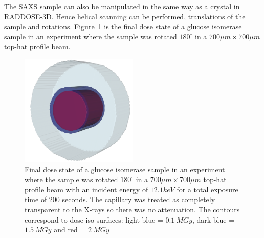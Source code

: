 The SAXS sample can also be manipulated in the same way as a crystal in RADDOSE-3D. Hence helical scanning can be performed, translations of the sample and rotations. Figure~\ref{fig:SAXS cylinder rotated} is the final dose state of a glucose isomerase sample in an experiment where the sample was rotated $180^{\circ}$ in a $ 700 \mu m \times 700 \mu m $ top-hat profile beam.
\begin{figure}
    \centering
    \includegraphics[width=0.5\textwidth]{figures/saxs/SAXScylinder.png}
    \caption{Final dose state of a glucose isomerase sample in an experiment where the sample was rotated $180^{\circ}$ in a $ 700 \mu m \times 700 \mu m $ top-hat profile beam with an incident energy of $ 12.1 keV $ for a total exposure time of 200 seconds. The capillary was treated as completely transparent to the X-rays so there was no attenuation. The contours correspond to dose iso-surfaces: light blue = $ 0.1\ MGy $, dark blue = $ 1.5\ MGy $ and red = $ 2\ MGy $ }
    \label{fig:SAXS cylinder rotated}
\end{figure}
